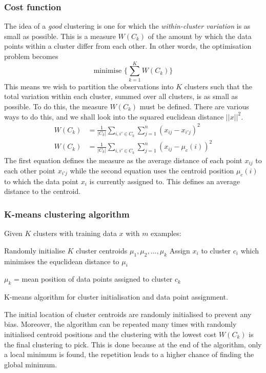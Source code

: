 \documentclass[CS5104-Notes.tex]{subfiles}
\begin{document}
\subsubsection{Cost function}
The idea of a \textit{good} clustering is one for which the \textit{within-cluster variation} is as small as possible. This is a measure $W(C_{k})$ of the amount by which the data points within a cluster differ from each other. In other words, the optimisation problem becomes
\begin{equation}
\text{minimise } \Bigg\{\sum_{k=1}^{K}W(C_{k})\Bigg\}
\end{equation}
This means we wish to partition the observations into $K$ clusters such that the total variation within each cluster, summed over all clusters, is as small as possible. To do this, the measure $W(C_{k})$ must be defined. There are various ways to do this, and we shall look into the squared euclidean distance $||x||^{2}$.
\begin{align}
  W(C_{k}) &= \frac{1}{|C_{k}|}\sum_{i,i' \in C_{k}}\sum_{j=1}^{n}(x_{ij} - x_{i'j})^{2} \\
  W(C_{k}) &= \frac{1}{|C_{k}|}\sum_{i,i' \in C_{k}}\sum_{j=1}^{n}(x_{ij} - \mu_{c}(i))^{2}
\end{align}
The first equation defines the measure as the average distance of each point $x_{ij}$ to each other point $x_{i'j}$ while the second equation uses the centroid position $\mu_{c}(i)$ to which the data point $x_{i}$ is currently assigned to. This defines an average distance to the centroid.

\subsubsection{K-means clustering algorithm}
Given $K$ clusters with training data $x$ with $m$ examples:
\begin{algorithm}[H]
\begin{algorithmic}[1]
  \State Randomly initialise $K$ cluster centroids $\mu_{1}, \mu_{2}, ..., \mu_{k}$
  \Repeat
      \State Assign $x_{i}$ to cluster $c_{i}$ which minimises the equclidean distance to $\mu_{i}$
    \EndFor

      \State $\mu_{k}$ = mean position of data points assigned to cluster $c_{k}$
    \EndFor
\EndProcedure
\end{algorithmic}
\caption{K-means algorithm for cluster initialisation and data point assignment.}
\end{algorithm}
The initial location of cluster centroids are randomly initialised to prevent any bias. Moreover, the algorithm can be repeated many times with randomly initialised centroid positions and the clustering with the lowest cost $W(C_{k})$ is the final clustering to pick. This is done because at the end of the algorithm, only a local minimum is found, the repetition leads to a higher chance of finding the global minimum.
\end{document}
